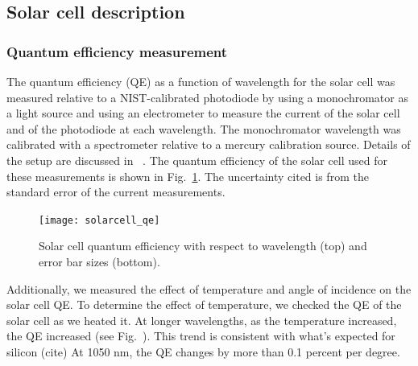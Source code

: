 \subsection{Solar cell description}

\subsubsection{Quantum efficiency measurement}
 
The quantum efficiency (QE) as a function of wavelength for the solar cell was measured relative to a NIST-calibrated photodiode by using a monochromator as a light source and using an electrometer to measure the current of the solar cell and of the photodiode at each wavelength. The monochromator wavelength was calibrated with a spectrometer relative to a mercury calibration source. Details of the setup are discussed in ~\cite{solarcell}. The quantum efficiency of the solar cell used for these measurements is shown in Fig.~\ref{fig:qe}. The uncertainty cited is from the standard error of the current measurements.

\begin{figure}[!h]
\centering
\texttt{[image: solarcell\_qe]}
\caption{Solar cell quantum efficiency with respect to wavelength (top) and error bar sizes (bottom).}
\label{fig:qe}
\end{figure}

Additionally, we measured the effect of temperature and angle of incidence on the solar cell QE. To determine the effect of temperature, we checked the QE of the solar cell as we heated it. At longer wavelengths, as the temperature increased, the QE increased (see Fig.~).  This trend is consistent with what's expected for silicon (cite) At 1050 nm, the QE changes by more than 0.1 percent per degree. 


